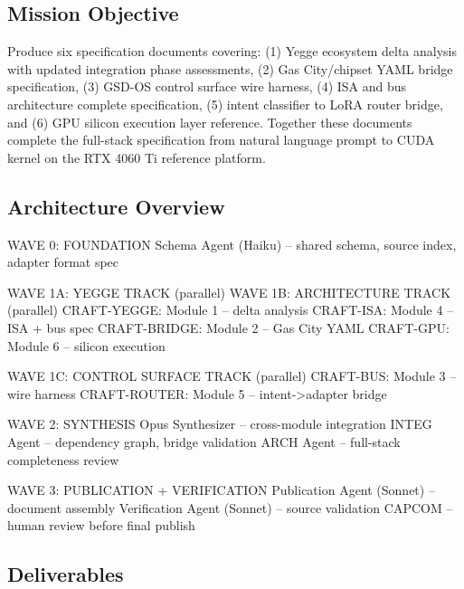 \documentclass[11pt,letterpaper]{article}
\begin{document}
\subsection{Mission Objective}

Produce six specification documents covering: (1) Yegge ecosystem delta analysis with updated integration phase assessments, (2) Gas City/chipset YAML bridge specification, (3) GSD-OS control surface wire harness, (4) ISA and bus architecture complete specification, (5) intent classifier to LoRA router bridge, and (6) GPU silicon execution layer reference. Together these documents complete the full-stack specification from natural language prompt to CUDA kernel on the RTX 4060 Ti reference platform.

\subsection{Architecture Overview}

\begin{asciibox}
WAVE 0: FOUNDATION
  Schema Agent (Haiku) -- shared schema, source index, adapter format spec

WAVE 1A: YEGGE TRACK (parallel)            WAVE 1B: ARCHITECTURE TRACK (parallel)
  CRAFT-YEGGE: Module 1 -- delta analysis    CRAFT-ISA: Module 4 -- ISA + bus spec
  CRAFT-BRIDGE: Module 2 -- Gas City YAML    CRAFT-GPU: Module 6 -- silicon execution

WAVE 1C: CONTROL SURFACE TRACK (parallel)
  CRAFT-BUS: Module 3 -- wire harness
  CRAFT-ROUTER: Module 5 -- intent->adapter bridge

WAVE 2: SYNTHESIS
  Opus Synthesizer -- cross-module integration
  INTEG Agent -- dependency graph, bridge validation
  ARCH Agent -- full-stack completeness review

WAVE 3: PUBLICATION + VERIFICATION
  Publication Agent (Sonnet) -- document assembly
  Verification Agent (Sonnet) -- source validation
  CAPCOM -- human review before final publish
\end{asciibox}

\subsection{Deliverables}
\end{document}
